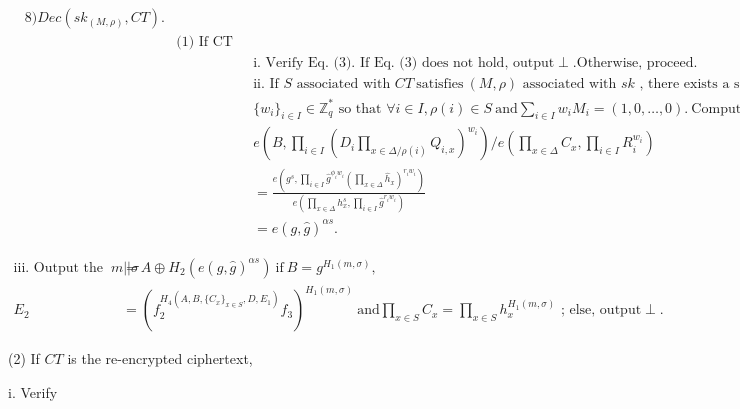 \documentclass[runningheads]{llncs}
\begin{document}
$\begin{aligned}&\mathrm{8)}Dec(sk_{(M,\rho)},CT).\\&&\text{(1) If CT is the original ciphertext,}\\&&&\text{i. Verify Eq. (3). If Eq. (3) does not hold, output}\perp.\text{Otherwise, proceed}.\\&&&\text{ii. If }S\text{ associated with }CT\mathrm{~satisfies~}(M,\rho)\text{ associated with }sk\text{ , there exists a set of constants}\\&&&\{w_i\}_{i\in I}\in\mathbb{Z}_q^*\text{ so that }\forall i\in I,\rho(i)\in S\mathrm{~and}\sum_{i\in I}w_iM_i=(1,0,\ldots,0).\mathrm{~Compute}\\&&&e\left(B,\prod_{i\in I}\left(D_i\prod_{x\in\Delta/\rho(i)}Q_{i,x}\right)^{w_i}\right)/e\left(\prod_{x\in\Delta}C_x,\prod_{i\in I}R_i^{w_i}\right)\\&&&=\frac{e\left(g^s,\prod_{i\in I}\hat{g}^{\phi_iw_i}\left(\prod_{x\in\Delta}\hat{h}_x\right)^{r_iw_i}\right)}{e\left(\prod_{x\in\Delta}h_x^s,\prod_{i\in I}\hat{g}^{r_iw_i}\right)}\\&&&=e(g,\hat{g})^{\alpha s}.\end{aligned}$

$\begin{aligned}\text{iii. Output the message by computing }m||\sigma&=A\oplus H_{2}(e(g,\hat{g})^{\alpha s})\mathrm{~if~}B=g^{H_{1}(m,\sigma)},\\E_{2}&=(f_{2}^{H_{4}(A,B,\{C_{x}\}_{x\in S},D,E_{1})}f_{3})^{H_{1}(m,\sigma)}\mathrm{~and}\prod_{x\in S}C_{x}=\prod_{x\in S}h_{x}^{H_{1}(m,\sigma)}\text{ ; else, output}\perp.\end{aligned}$

(2) If $CT$ is the re-encrypted ciphertext,

i. Verify
\end{document}
